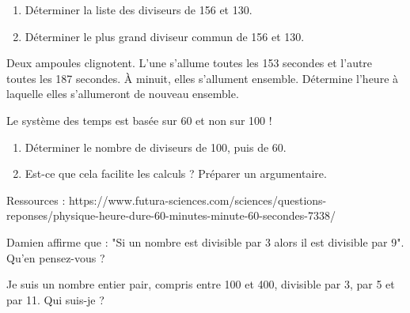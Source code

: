  
\begin{enumerate}
\item Déterminer la liste des diviseurs de 156 et 130. 
\item Déterminer le plus grand diviseur commun de 156 et 130.
\end{enumerate}



Deux ampoules clignotent. L'une s'allume toutes les 153 secondes et l'autre toutes les 187 secondes. À minuit, elles s'allument ensemble.
Détermine l'heure à laquelle elles s'allumeront de nouveau ensemble.













Le système des temps est basée sur 60 et non sur 100 ! 
\begin{enumerate}
\item Déterminer le nombre de diviseurs de 100, puis de 60. 
\item Est-ce que cela facilite les calculs ? Préparer un argumentaire.
\end{enumerate}


\begin{scriptsize}
Ressources : 
https://www.futura-sciences.com/sciences/questions-reponses/physique-heure-dure-60-minutes-minute-60-secondes-7338/
\end{scriptsize}





\begin{Reg}

\end{Reg}

 

Damien affirme que : "Si un nombre est divisible par 3 alors il est divisible par 9". Qu'en pensez-vous ?



Je suis un nombre entier pair, compris entre 100 et 400, divisible par 3, par 5 et par 11. Qui suis-je ?


